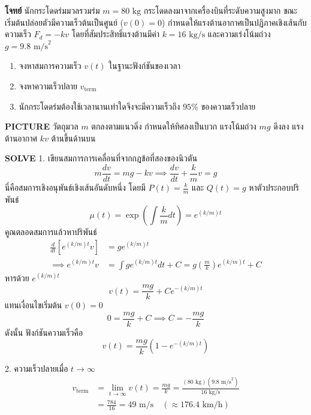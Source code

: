 \begin{mathexample}
\textbf{โจทย์} นักกระโดดร่มมวลรวมร่ม $m = 80\text{ kg}$ กระโดดลงมาจากเครื่องบินที่ระดับความสูงมาก ขณะเริ่มต้นปล่อยตัวมีความเร็วต้นเป็นศูนย์ ($v(0) = 0$) กำหนดให้แรงต้านอากาศเป็นปฏิภาคเชิงเส้นกับความเร็ว $F_d = -kv$ โดยที่สัมประสิทธิ์แรงต้านมีค่า $k = 16\text{ kg/s}$ และความเร่งโน้มถ่วง $g = 9.8\text{ m/s}^2$
\begin{enumerate}
    \item จงหาสมการความเร็ว $v(t)$ ในฐานะฟังก์ชันของเวลา
    \item จงหาความเร็วปลาย $v_{\text{term}}$
    \item นักกระโดดร่มต้องใช้เวลานานเท่าใดจึงจะมีความเร็วถึง $95\%$ ของความเร็วปลาย
\end{enumerate}

\vspace{0.2cm}
\textbf{PICTURE} วัตถุมวล $m$ ตกลงตามแนวดิ่ง กำหนดให้ทิศลงเป็นบวก แรงโน้มถ่วง $mg$ ดึงลง แรงต้านอากาศ $kv$ ต้านขึ้นด้านบน

\vspace{0.2cm}
\textbf{SOLVE}
1. เขียนสมการการเคลื่อนที่จากกฎข้อที่สองของนิวตัน
\begin{equation}
m\frac{dv}{dt} = mg - kv \implies \frac{dv}{dt} + \frac{k}{m}v = g
\end{equation}
นี่คือสมการเชิงอนุพันธ์เชิงเส้นอันดับหนึ่ง โดยมี $P(t) = \frac{k}{m}$ และ $Q(t) = g$
หาตัวประกอบปริพันธ์
\begin{equation}
\mu(t) = \exp\left(\int \frac{k}{m} dt\right) = e^{(k/m)t}
\end{equation}
คูณตลอดสมการแล้วหาปริพันธ์
\begin{align}
\frac{d}{dt}\left[ e^{(k/m)t} v \right] &= g e^{(k/m)t} \nonumber\\
\implies e^{(k/m)t} v &= \int g e^{(k/m)t} dt + C = g \left(\frac{m}{k}\right)e^{(k/m)t} + C
\end{align}
หารด้วย $e^{(k/m)t}$
\begin{equation}
v(t) = \frac{mg}{k} + C e^{-(k/m)t}
\end{equation}
แทนเงื่อนไขเริ่มต้น $v(0) = 0$
\begin{equation}
0 = \frac{mg}{k} + C \implies C = -\frac{mg}{k}
\end{equation}
ดังนั้น ฟังก์ชันความเร็วคือ
\begin{equation}
v(t) = \frac{mg}{k}\left(1 - e^{-(k/m)t}\right)
\end{equation}

2. ความเร็วปลายเมื่อ $t \to \infty$
\begin{align}
v_{\text{term}} &= \lim_{t \to \infty} v(t) = \frac{mg}{k} = \frac{(80\text{ kg})(9.8\text{ m/s}^2)}{16\text{ kg/s}} \nonumber\\
&= \frac{784}{16} = 49\text{ m/s} \quad (\approx 176.4\text{ km/h})
\end{align}


\end{mathexample}
